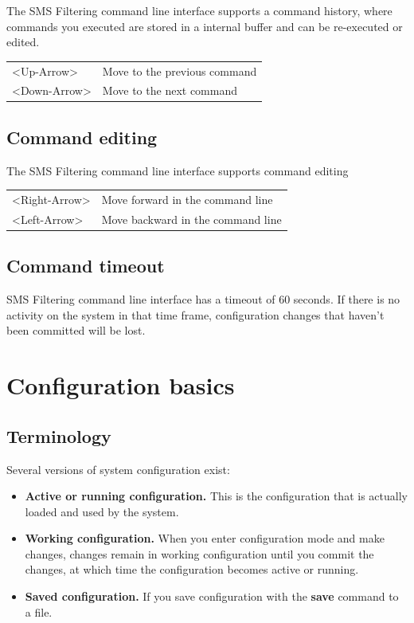 \documentclass[a4paper,latin]{paper}
\begin{document}
The SMS Filtering command line interface supports a command history, where commands you
executed are stored in a internal buffer and can be re-executed or edited.\newline

\begin{tabular}{ l l }
	\textless{}Up-Arrow\textgreater   & Move to the previous command \\
	\textless{}Down-Arrow\textgreater & Move to the next command
\end{tabular}

\subsection{Command editing}

The SMS Filtering command line interface supports command editing\newline

\begin{tabular}{ l l }
	\textless{}Right-Arrow\textgreater   & Move forward in the command line \\
	\textless{}Left-Arrow\textgreater    & Move backward in the command line
\end{tabular}

\subsection{Command timeout}

SMS Filtering command line interface has a timeout of 60 seconds. If there is no activity on the
system in that time frame, configuration changes that haven’t been committed will be lost.

\section{Configuration basics}

\subsection{Terminology}

Several versions of system configuration exist:
\begin{itemize}
	\item \textbf{Active or running configuration.} This is the configuration that is actually loaded and
	      used by the system.
	\item \textbf{Working configuration.} When you enter configuration mode and make changes,
	      changes remain in working configuration until you commit the changes, at which
	      time the configuration becomes active or running.
	\item \textbf{Saved configuration.} If you save configuration with the \textbf{save} command to a file.
\end{itemize}
\end{document}

